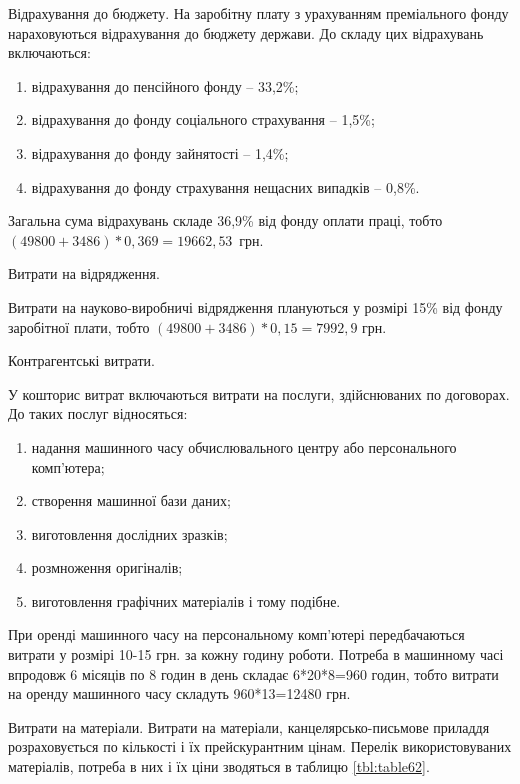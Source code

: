 Відрахування до бюджету. 
На заробітну плату з урахуванням преміального фонду нараховуються відрахування до бюджету держави. До складу цих відрахувань включаються:
\begin{enumerate}
\item відрахування до пенсійного фонду – 33,2\%;
\item відрахування до фонду соціального страхування – 1,5\%;
\item відрахування до фонду зайнятості – 1,4\%;
\item відрахування до фонду страхування нещасних випадків – 0,8\%.
\end{enumerate}

Загальна сума відрахувань складе 36,9\% від фонду оплати праці, тобто \mbox{$(49800+3486)*0,369 = 19662,53$ грн}.

Витрати на відрядження.

Витрати на науково-виробничі відрядження плануються у розмірі 15\% від фонду заробітної плати, тобто \mbox{$(49800+3486)*0,15 = 7992,9$} грн.

Контрагентські витрати.

У кошторис витрат включаються витрати на послуги, здійснюваних по договорах. До таких послуг відносяться:
\begin{enumerate}
\item надання машинного часу обчислювального центру або персонального комп'ютера;
\item створення машинної бази даних;
\item виготовлення дослідних зразків;
\item розмноження оригіналів;
\item виготовлення графічних матеріалів і тому подібне.
\end{enumerate}

При оренді машинного часу на персональному комп'ютері передбачаються витрати у розмірі 10-15 грн. за кожну годину роботи. Потреба в машинному часі впродовж 6 місяців по 8 годин в день складає 6*20*8=960 годин, тобто витрати на оренду машинного часу складуть 960*13=12480 грн.

Витрати на матеріали. Витрати на матеріали, канцелярсько-письмове приладдя розраховується по кількості і їх прейскурантним цінам. Перелік використовуваних матеріалів, потреба в них і їх ціни зводяться в таблицю \ref{tbl:table62}.

